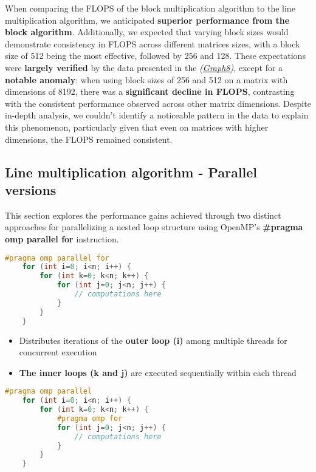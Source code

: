 When comparing the FLOPS of the block multiplication algorithm to
the line multiplication algorithm, we anticipated \textbf{superior performance
    from the block algorithm}. Additionally, we expected that varying block
sizes would demonstrate consistency in FLOPS across different matrices sizes,
with a block size of 512 being the most effective, followed by 256 and 128.
These expectations were \textbf{largely
    verified} by the data presented in the \textit{(\hyperref[graph:BLG9]{Graph8})},
except for a \textbf{notable anomaly}:
when using block sizes of 256 and 512 on a matrix with dimensions of 8192,
there was a \textbf{significant decline in FLOPS}, contrasting with the consistent
performance observed across other matrix dimensions. Despite in-depth analysis,
we couldn't identify a noticeable pattern in the data to explain this phenomenon,
particularly given that even on matrices with higher dimensions, the FLOPS remained
consistent.

\newpage

\subsection{Line multiplication algorithm - Parallel versions}
This section explores the performance gains achieved through two distinct
approaches for parallelizing a nested loop structure using OpenMP's \textbf{\#pragma omp parallel
    for} instruction.

\hspace*{1cm}

\begin{lstlisting}[language=C++, caption=Parallel 1]
    #pragma omp parallel for
    for (int i=0; i<n; i++) {
        for (int k=0; k<n; k++) {
            for (int j=0; j<n; j++) {
                // computations here
            }
        }
    }
\end{lstlisting}

\begin{itemize}
    \item Distributes iterations of the \textbf{outer loop (i)} among multiple threads for concurrent execution
    \item \textbf{The inner loops (k and j)} are executed sequentially within each thread
\end{itemize}

\hspace*{1cm}

\begin{lstlisting}[language=C++, caption=Parallel 2]
    #pragma omp parallel
    for (int i=0; i<n; i++) {
        for (int k=0; k<n; k++) {
            #pragma omp for
            for (int j=0; j<n; j++) {
                // computations here
            }
        }
    }
\end{lstlisting}

